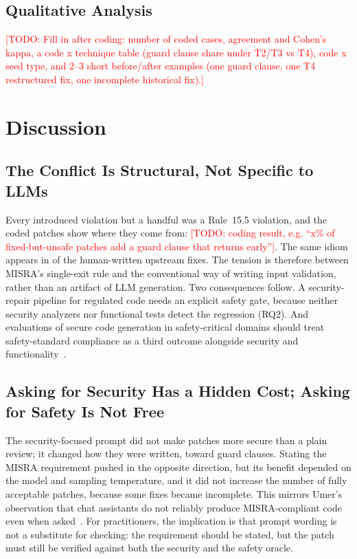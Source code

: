 \documentclass[12pt]{IEEEtran}
\newcommand{\todo}[1]{\textcolor{red}{[TODO: #1]}}
\begin{document}
\subsection{Qualitative Analysis}
\todo{Fill in after coding: number of coded cases, agreement and Cohen's kappa, a code x technique table (guard clause share under T2/T3 vs T4), code x seed type, and 2--3 short before/after examples (one guard clause, one T4 restructured fix, one incomplete historical fix).}

\section{Discussion}

\subsection{The Conflict Is Structural, Not Specific to LLMs}
Every introduced violation but a handful was a Rule~15.5 violation, and the coded patches show where they come from: \todo{coding result, e.g. ``x\% of fixed-but-unsafe patches add a guard clause that returns early''}. The same idiom appears in  of the  human-written upstream fixes. The tension is therefore between MISRA's single-exit rule and the conventional way of writing input validation, rather than an artifact of LLM generation. Two consequences follow. A security-repair pipeline for regulated code needs an explicit safety gate, because neither security analyzers nor functional tests detect the regression (RQ2). And evaluations of secure code generation in safety-critical domains should treat safety-standard compliance as a third outcome alongside security and functionality~\cite{rethinking2026, peng2025cweval}.

\subsection{Asking for Security Has a Hidden Cost; Asking for Safety Is Not Free}
The security-focused prompt did not make patches more secure than a plain review; it changed how they were written, toward guard clauses. Stating the MISRA requirement pushed in the opposite direction, but its benefit depended on the model and sampling temperature, and it did not increase the number of fully acceptable patches, because some fixes became incomplete. This mirrors Umer's observation that chat assistants do not reliably produce MISRA-compliant code even when asked~\cite{umer2025misra}. For practitioners, the implication is that prompt wording is not a substitute for checking: the requirement should be stated, but the patch must still be verified against both the security and the safety oracle.
\end{document}
